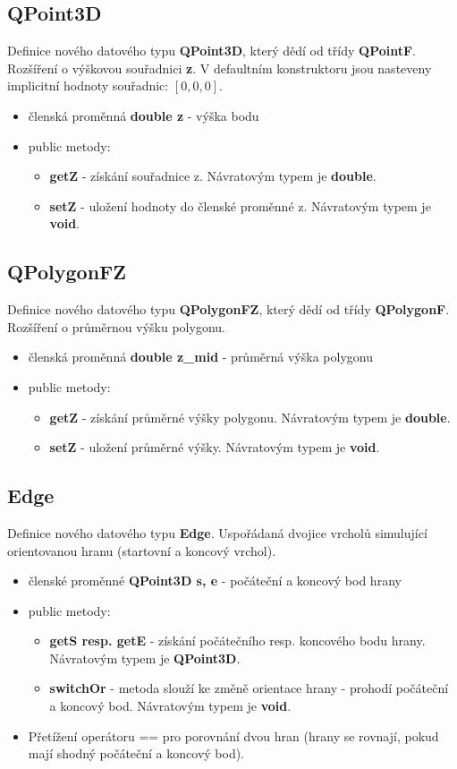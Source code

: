 \documentclass[a4paper, 12pt]{article}
\begin{document}
%
\subsection{QPoint3D}
Definice nového datového typu \textbf{QPoint3D}, který dědí od třídy \textbf{QPointF}. Rozšíření o výškovou souřadnici \textbf{z}. V defaultním konstruktoru jsou nasteveny implicitní hodnoty souřadnic: $[0,0,0]$.
\begin{itemize}
	\item členská proměnná \textbf{double z} - výška bodu
	\item public metody:
	\begin{itemize}
		\item \textbf{getZ} - získání souřadnice z. Návratovým typem je \textbf{double}. 
		\item \textbf{setZ} - uložení hodnoty do členské proměnné z. Návratovým typem je \textbf{void}. 
	\end{itemize}
\end{itemize}
\subsection{QPolygonFZ}
Definice nového datového typu \textbf{QPolygonFZ}, který dědí od třídy \textbf{QPolygonF}. Rozšíření o průměrnou výšku polygonu.
\begin{itemize}
	\item členská proměnná \textbf{double z\_mid} - průměrná výška polygonu
	\item public metody:
	\begin{itemize}
		\item \textbf{getZ} - získání průměrné výšky polygonu. Návratovým typem je \textbf{double}.
		\item \textbf{setZ} - uložení průměrné výšky. Návratovým typem je \textbf{void}.
	\end{itemize}
\end{itemize}

\subsection{Edge}
Definice nového datového typu \textbf{Edge}. Uspořádaná dvojice vrcholů simulující orientovanou hranu (startovní a koncový vrchol).

\begin{itemize}
	\item členské proměnné \textbf{QPoint3D s, e} - počáteční a koncový bod hrany
	\item public metody:
	\begin{itemize}
		\item \textbf{getS resp. getE} - získání počátečního resp. koncového bodu hrany. Návratovým typem je \textbf{QPoint3D}. 
		\item \textbf{switchOr} - metoda slouží ke změně orientace hrany - prohodí počáteční a koncový bod. Návratovým typem je \textbf{void}. 
	\end{itemize}
	\item Přetížení operátoru == pro porovnání dvou hran (hrany se rovnají, pokud mají shodný počáteční a koncový bod).
\end{itemize}
\end{document}
